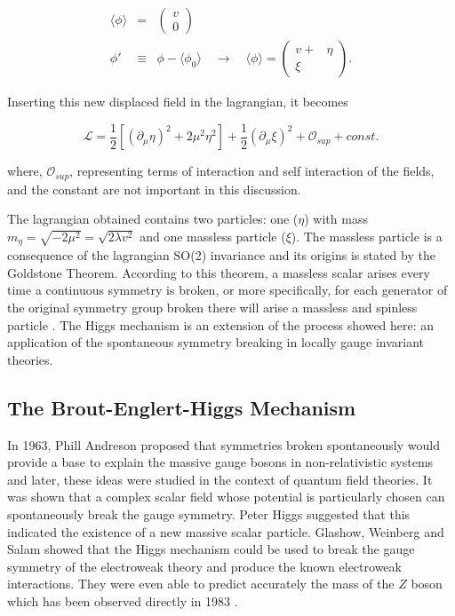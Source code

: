 \begin{eqnarray}
\langle \phi \rangle &=& \left(\begin{aligned} v \\ 0 \end{aligned} \right) \\ \phi' &\equiv& \phi - \langle \phi_0 \rangle \quad \rightarrow \quad \langle \phi \rangle = \left(\begin{aligned} v +& \eta \\ \xi& \end{aligned} \right).
\end{eqnarray}

Inserting this new displaced field in the lagrangian, it becomes

\begin{equation}
\mathcal{L} = \dfrac{1}{2}[(\partial_{\mu}\eta)^2 + 2\mu^2\eta^2] + \dfrac{1}{2}(\partial_{\mu}\xi)^2 + \mathcal{O}_{sup} + const.
\end{equation}

where, $\mathcal{O}_{sup}$, representing terms of interaction and self interaction of the fields, and the constant are not important in this discussion.

The lagrangian obtained contains two particles: one ($\eta$) with mass $m_{\eta} = \sqrt{-2\mu^2} = \sqrt{2\lambda v^2}$ and one massless particle ($\xi$). The massless particle is a consequence of the lagrangian SO(2) invariance and its origins is stated by the Goldstone Theorem. According to this theorem, a massless scalar arises every time a continuous symmetry is broken, or more specifically, for each generator of the original symmetry group broken there will arise a massless and spinless particle \cite{bib:halzen-martin-1984,bib:griffiths-2008,bib:quigg-1983}. The Higgs mechanism is an extension of the process showed here: an application of the spontaneous symmetry breaking in locally gauge invariant theories.


\subsection{The Brout-Englert-Higgs Mechanism}
In 1963, Phill Andreson proposed that symmetries broken spontaneously would provide a base to explain the massive gauge bosons in non-relativistic systems and later, these ideas were studied in the context of quantum field theories. It was shown that a complex scalar field whose potential is particularly chosen can spontaneously break the gauge symmetry. Peter Higgs suggested that this indicated the existence of a new massive scalar particle. Glashow, Weinberg and Salam showed that the Higgs mechanism could be used to break the gauge symmetry of the electroweak theory and produce the known electroweak interactions. They were even able to predict accurately the mass of the $Z$ boson which has been observed directly in 1983 \cite{bib:PhysLettB-126-1983, bib:EurophysNews-14-10-1983}.

